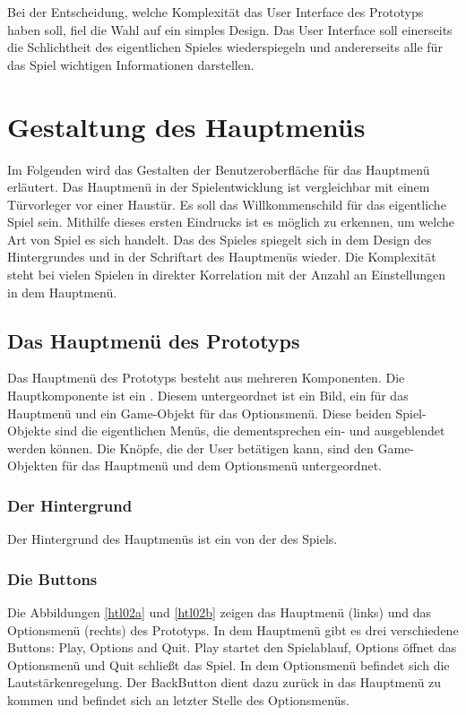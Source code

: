 \noindent
Bei der Entscheidung, welche Komplexität das User Interface des Prototyps haben soll, fiel die Wahl auf ein simples Design. 
Das User Interface soll einerseits die Schlichtheit des eigentlichen Spieles wiederspiegeln und andererseits alle für das Spiel wichtigen Informationen darstellen.

\section{Gestaltung des Hauptmenüs}

Im Folgenden wird das Gestalten der Benutzeroberfläche für das Hauptmenü erläutert. 
Das Hauptmenü in der Spielentwicklung ist vergleichbar mit einem Türvorleger vor einer Haustür. Es soll das Willkommenschild für das eigentliche Spiel sein. 
Mithilfe dieses ersten Eindrucks ist es möglich zu erkennen, um welche Art von Spiel es sich handelt. Das  des Spieles spiegelt sich in dem Design des Hintergrundes und in der Schriftart des Hauptmenüs wieder. Die Komplexität steht bei vielen Spielen in direkter Korrelation mit der Anzahl an Einstellungen in dem Hauptmenü.

\pagebreak

\subsection{Das Hauptmenü des Prototyps}

Das Hauptmenü des Prototyps besteht aus mehreren Komponenten. Die Hauptkomponente ist ein . Diesem untergeordnet ist ein Bild, ein  für das Hauptmenü und ein Game-Objekt für das Optionsmenü. Diese beiden Spiel-Objekte sind die eigentlichen Menüs, die dementsprechen ein- und ausgeblendet werden können. Die Knöpfe, die der User betätigen kann, sind den Game-Objekten für das Hauptmenü und dem Optionsmenü untergeordnet. 

\subsubsection{Der Hintergrund}
Der Hintergrund des Hauptmenüs ist ein  von der  des Spiels. 
\subsubsection{Die Buttons}
Die Abbildungen \ref{htl02a} und \ref{htl02b} zeigen das Hauptmenü (links) und das Optionsmenü (rechts) des Prototyps. In dem Hauptmenü gibt es drei verschiedene Buttons: Play, Options and Quit. Play startet den Spielablauf, Options öffnet das Optionsmenü und Quit schließt das Spiel. In dem Optionsmenü befindet sich die Lautstärkenregelung. Der \glqq Back\grqq \space Button dient dazu zurück in das Hauptmenü zu kommen und befindet sich an letzter Stelle des Optionsmenüs.


